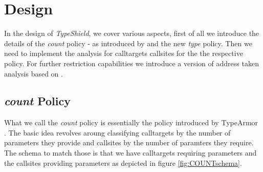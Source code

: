 \makeatletter
\providecommand{\bigsqcap}{%
  \mathop{%
    \mathpalette\@updown\bigsqcup
  }%
}
\newcommand*{\@updown}[2]{%
  \rotatebox[origin=c]{180}{$\m@th#1#2$}%
}
\makeatother

\chapter{Design}
\label{chapter:Design}

In the design of \textit{TypeShield}, we cover various aspects, first of all we introduce the details of the \emph{count} policy - as introduced by \cite{veen:typearmor} and the new \emph{type} policy. Then we need to implement the analysis for calltargets callsites for the the respective policy. For further restriction capabilities we introduce a version of address taken analysis based on \cite{mingwei:sekar}. 

\section{\emph{count} Policy}
\label{section:countpolicy}

What we call the \emph{count} policy is essentially the policy introduced by TypeArmor \cite{veen:typearmor}. The basic idea revolves aroung classifying calltargets by the number of parameters they provide and callsites by the number of paramters they require. The schema to match those is that we have calltargets requiring parameters and the callsites providing parameters as depicted in figure \ref{fig:COUNTschema}.

